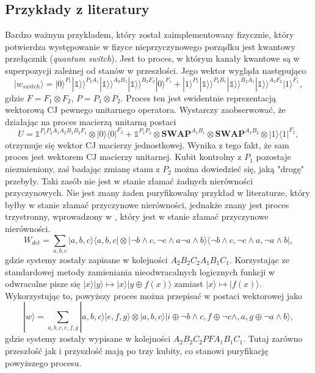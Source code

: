 \documentclass[10pt]{article} %
\newcommand{\Ket}[1]{|#1\rangle}
\newcommand{\Bra}[1]{\langle#1|}
\newcommand{\KKet}[1]{|#1\rangle\rangle}
\newcommand{\I}{\mathbb{1}}
\begin{document}
\subsection{Przykłady z literatury}
Bardzo ważnym przykładem, który został zaimplementowany fizycznie, który potwierdza występowanie w fizyce nieprzyczynowego porządku jest kwantowy przełącznik (\textit{quantum switch}). Jest to proces, w którym kanały kwantowe są w superpozycji zależnej od stanów w przeszłości. Jego wektor wygląda następująco
\begin{equation}
\Ket{w_{switch}} = \Ket{0}^{P_1}\KKet{\I}^{P_2A_1}\KKet{\I}^{A_2B_1}\KKet{\I}^{B_2F_2}\Ket{0}^{F_1}+\Ket{1}^{P_1}\KKet{\I}^{P_2B_1}\KKet{\I}^{B_2A_1}\KKet{\I}^{A_2F_2}\Ket{1}^{F_1},
\end{equation} gdzie $F = F_1 \otimes F_2$, $P = P_1 \otimes P_2$. Proces ten jest ewidentnie reprezentacją wektorową CJ pewnego unitarnego operatora. Wystarczy zaobserwować, że działając na proces macierzą unitarną postaci
\begin{equation}
U = \I^{P_1P_2A_1A_2B_1B_2F_1}\otimes\Ket{0}\Bra{0}^{F_2} + \I^{P_1P_2} \otimes \mathbf{SWAP}^{A_1B_1} \otimes \mathbf{SWAP}^{A_2B_2} \otimes \Ket{1}\Bra{1}^{F_2},
\end{equation}
otrzymuje się wektor CJ macierzy jednostkowej. Wynika z tego fakt, że sam proces jest wektorem CJ macierzy unitarnej.
Kubit kontrolny z $P_1$ pozostaje niezmieniony, zaś badając zmianę stanu z $P_2$ można dowiedzieć się, jaką "drogę" przebyły. Taki zasób nie jest w stanie złamać żadnych nierówności przyczynowych.
Nie jest znany żaden puryfikowalny przykład w literaturze, który byłby w stanie złamać przyczynowe nierówności, jednakże znany jest proces trzystronny, wprowadzony w \cite{logic}, który jest w stanie złamać przyczynowe nierówności. 
\begin{equation}
W_{det} = \sum_{a,b,c} \Ket{a,b,c}\Bra{a,b,c} \otimes \Ket{\neg b \land c, \neg c\land a \neg a\land b} \Bra{\neg b \land c, \neg c\land a ,\neg a\land b},
\end{equation} gdzie systemy zostały zapisane w kolejności $A_2B_2C_2A_1B_1C_1$. Korzystając ze standardowej metody zamieniania nieodwracalnych logicznych funkcji w odwracalne pisze się $\Ket{x}\Ket{y} \mapsto \Ket{x}\Ket{y \oplus f(x)}$ zamiast $\Ket{x} \mapsto \Ket{f(x)}$. Wykorzystując to, powyższy proces można przepisać w postaci wektorowej jako
\begin{equation}
\Ket{w} = \sum_{a,b,c,e,f,g} \Ket{a,b,c}\Ket{e,f,g} \otimes \Ket{a,b,c}\Ket{i \oplus \neg b \land c,f \oplus \neg c\land, a , g\oplus \neg a\land b},
\end{equation} gdzie systemy zostały wypisane w kolejności $A_2B_2C_2PFA_1B_1C_1$. Tutaj zarówno przeszłość jak i przyszłość mają po trzy kubity, co stanowi puryfikację powyższego procesu.
\end{document}
